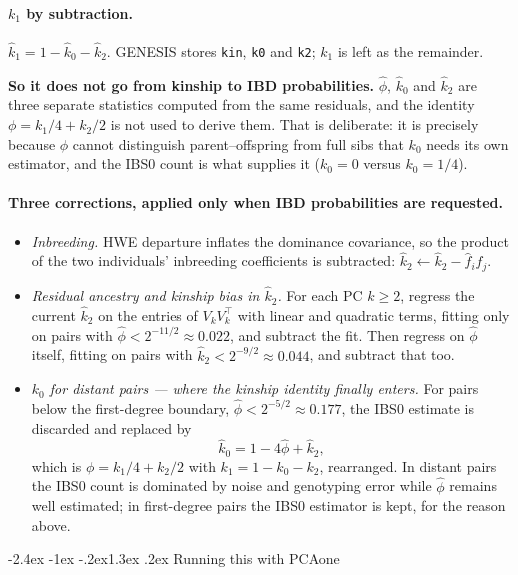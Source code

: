 \documentclass[10pt,a4paper]{article}
\makeatletter
\renewcommand\section{\@startsection{section}{1}{\z@}%
  {-2.4ex \@plus -1ex \@minus -.2ex}{1.3ex \@plus.2ex}%
  {\normalfont\large\bfseries\color{hdr}}}
\newenvironment{tightitem}{%
  \begin{itemize}\setlength{\itemsep}{1pt}\setlength{\parskip}{0pt}%
  \setlength{\topsep}{3pt}\setlength{\parsep}{0pt}}{\end{itemize}}
\makeatother
\begin{document}
\paragraph{$k_1$ by subtraction.} $\hat k_1=1-\hat k_0-\hat k_2$. GENESIS stores \texttt{kin}, \texttt{k0}
and \texttt{k2}; $k_1$ is left as the remainder.

\medskip\noindent
\textbf{So it does not go from kinship to IBD probabilities.} $\hat\phi$, $\hat k_0$ and $\hat k_2$ are three
separate statistics computed from the same residuals, and the identity $\phi=k_1/4+k_2/2$ is not used to
derive them. That is deliberate: it is precisely because $\phi$ cannot distinguish parent--offspring from
full sibs that $k_0$ needs its own estimator, and the IBS0 count is what supplies it ($k_0=0$ versus
$k_0=1/4$).

\paragraph{Three corrections, applied only when IBD probabilities are requested.}
\begin{tightitem}
  \item \emph{Inbreeding.} HWE departure inflates the dominance covariance, so the product of the two
  individuals' inbreeding coefficients is subtracted: $\hat k_2\leftarrow\hat k_2-\hat f_i\hat f_j$.
  \item \emph{Residual ancestry and kinship bias in $\hat k_2$.} For each PC $k\ge2$, regress the current
  $\hat k_2$ on the entries of $V_kV_k^{\!\top}$ with linear and quadratic terms, fitting only on pairs with
  $\hat\phi<2^{-11/2}\approx0.022$, and subtract the fit. Then regress on $\hat\phi$ itself, fitting on pairs
  with $\hat k_2<2^{-9/2}\approx0.044$, and subtract that too.
  \item \emph{$k_0$ for distant pairs --- where the kinship identity finally enters.} For pairs below the
  first-degree boundary, $\hat\phi<2^{-5/2}\approx0.177$, the IBS0 estimate is discarded and replaced by
  \begin{equation*}
  \hat k_0=1-4\hat\phi+\hat k_2,
  \end{equation*}
  which is $\phi=k_1/4+k_2/2$ with $k_1=1-k_0-k_2$, rearranged. In distant pairs the IBS0 count is dominated
  by noise and genotyping error while $\hat\phi$ remains well estimated; in first-degree pairs the IBS0
  estimator is kept, for the reason above.
\end{tightitem}

\section{Running this with PCAone}
\end{document}

